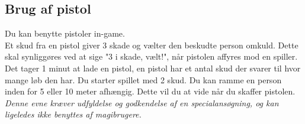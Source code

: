 \subsection*{Brug af pistol}
Du kan benytte pistoler in-game.\\
Et skud fra en pistol giver 3 skade og vælter den beskudte person omkuld. Dette skal synliggøres ved at sige "3 i skade, vælt!", når pistolen affyres mod en spiller.\\
Det tager 1 minut at lade en pistol, en pistol har et antal skud der svarer til hvor mange løb den har. Du starter spillet med 2 skud. Du kan ramme en person inden for 5 eller 10 meter afhængig. Dette vil du at vide når du skaffer pistolen.\\
\emph{Denne evne kræver udfyldelse og godkendelse af en specialansøgning, og kan ligeledes ikke benyttes af magibrugere.}\\